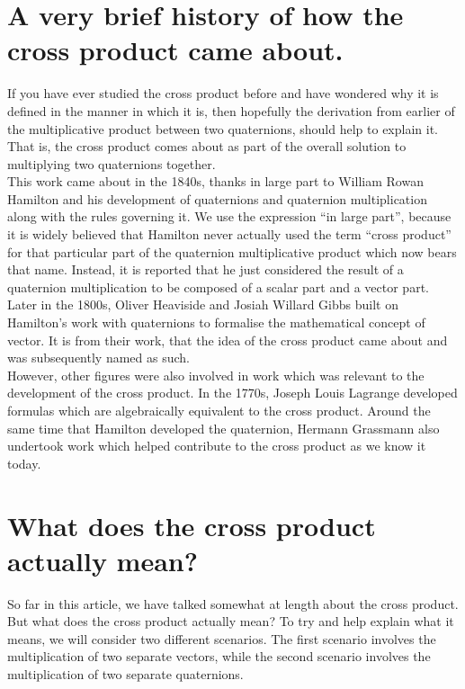\section{A very brief history of how the cross product came about.}

If you have ever studied the cross product before and have wondered why it is defined in the manner in which it is, then
hopefully the derivation from earlier of the multiplicative product between two quaternions, should help to explain it.
That is, the cross product comes about as part of the overall solution to multiplying two quaternions together. \\

This work came about in the 1840s, thanks in large part to William Rowan Hamilton and his development of quaternions and
quaternion multiplication along with the rules governing it. We use the expression
``in large part'', because it is widely believed that Hamilton never actually used the term ``cross product'' for that
particular part of the quaternion multiplicative product which now bears that name. Instead, it is reported that he just
considered the result of a quaternion multiplication to be composed of a scalar part and a vector part. Later in the 1800s, Oliver Heaviside and
Josiah Willard Gibbs built on Hamilton's work with quaternions to formalise the mathematical concept of vector. It is
from their work, that the idea of the cross product came about and was subsequently named as such. \\

However, other figures were also involved in work which was relevant to the development of the cross product. In the
1770s, Joseph Louis Lagrange developed formulas which are algebraically equivalent to the cross product. Around the same
time that Hamilton developed the quaternion, Hermann Grassmann also undertook work which helped contribute to the
cross product as we know it today.


\section{What does the cross product actually mean?}

So far in this article, we have talked somewhat at length about the cross product. But what does the cross product
actually mean? To try and help explain what it means, we will consider two different scenarios. The first scenario
involves the multiplication of two separate vectors, while the second scenario involves the multiplication of two
separate quaternions.  \\

